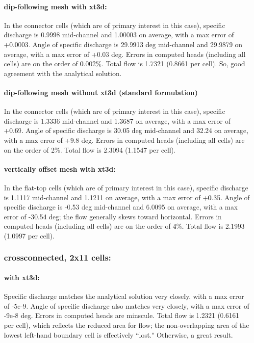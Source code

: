 \documentclass{article}
\begin{document}
\paragraph{dip-following mesh with xt3d:} In the connector cells (which are of primary interest in this case), specific discharge is 0.9998 mid-channel and 1.00003 on average, with a max error of +0.0003. Angle of specific discharge is 29.9913 deg mid-channel and 29.9879 on average, with a max error of +0.03 deg. Errors in computed heads (including all cells) are on the order of 0.002\%. Total flow is 1.7321 (0.8661 per cell). So, good agreement with the analytical solution.

\paragraph{dip-following mesh without xt3d (standard formulation)} In the connector cells (which are of primary interest in this case), specific discharge is 1.3336 mid-channel and 1.3687 on average, with a max error of +0.69. Angle of specific discharge is 30.05 deg mid-channel and 32.24 on average, with a max error of +9.8 deg. Errors in computed heads (including all cells) are on the order of 2\%. Total flow is 2.3094 (1.1547 per cell).

\paragraph{vertically offset mesh with xt3d:} In the flat-top cells (which are of primary interest in this case), specific discharge is 1.1117 mid-channel and 1.1211 on average, with a max error of +0.35. Angle of specific discharge is -0.53 deg mid-channel and 6.0095 on average, with a max error of -30.54 deg; the flow generally skews toward horizontal. Errors in computed heads (including all cells) are on the order of 4\%. Total flow is 2.1993 (1.0997 per cell).

\subsubsection{crossconnected, 2x11 cells:}

\paragraph{with xt3d:} Specific discharge matches the analytical solution very closely, with a max error of -5e-9. Angle of specific discharge also matches very closely, with a max error of -9e-8 deg. Errors in computed heads are minscule. Total flow is 1.2321 (0.6161 per cell), which reflects the reduced area for flow; the non-overlapping area of the lowest left-hand boundary cell is effectively ``lost." Otherwise, a great result.
\end{document}
